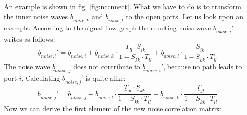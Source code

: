 \documentclass[10pt]{report}
\begin{document}
An example is shown in fig. \ref{fig:nconnect}. What we have to do is
to transform the inner noise waves $\underline{b}_{noise,k}$ and
$\underline{b}_{noise,l}$ to the open ports. Let us look upon an example.
According to the signal flow graph the resulting noise wave
$\underline{b}_{noise,i}'$ writes as follows:
\begin{equation}
\underline{b}_{noise,i}' = \underline{b}_{noise,i} +
    \underline{b}_{noise,k}\cdot
            \frac{\underline{T}_{ll}\cdot \underline{S}_{ik}}{1-\underline{S}_{kk}\cdot\underline{T}_{ll}} +
    \underline{b}_{noise,l}\cdot
            \frac{\underline{S}_{ik}}{1-\underline{S}_{kk}\cdot\underline{T}_{ll}}
\end{equation}
The noise wave $\underline{b}_{noise,j}$ does not contribute to
$\underline{b}_{noise,i}'$, because no path leads to port $i$.
Calculating $\underline{b}_{noise,j}'$ is quite alike:
\begin{equation}
\underline{b}_{noise,j}' = \underline{b}_{noise,j} +
    \underline{b}_{noise,l}\cdot
            \frac{\underline{T}_{jl}\cdot \underline{S}_{kk}}{1-\underline{S}_{kk}\cdot\underline{T}_{ll}} +
    \underline{b}_{noise,k}\cdot
            \frac{\underline{T}_{jl}}{1-\underline{S}_{kk}\cdot\underline{T}_{ll}}
\end{equation}
Now we can derive the first element of the new noise correlation matrix:
\end{document}
